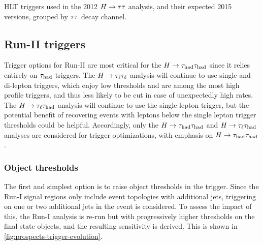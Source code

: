 \begin{table}[bp] 
  \centering
  \renewcommand{\arraystretch}{1.4}
  \caption{HLT triggers used in the 2012 $H\rightarrow\tau\tau$ analysis, and their expected 2015 versions, grouped by $\tau\tau$ decay channel.}
  
  \label{tab:prospects-triggersHLT}
\end{table}

\subsection{Run-II triggers}

Trigger options for Run-II are most critical for the $H\rightarrow\tau_\text{had}\tau_\text{had}$ since it relies entirely on $\tau_\text{had}$ triggers. The $H\rightarrow\tau_\ell\tau_\ell$ analysis will continue to use single and di-lepton triggers, which enjoy low thresholds and are among the most high profile triggers, and thus less likely to be cut in case of unexpectedly high rates. The $H\rightarrow\tau_\ell\tau_\text{had}$ analysis will continue to use the single lepton trigger, but the potential benefit of recovering events with leptons below the single lepton trigger thresholds could be helpful. Accordingly, only the $H\rightarrow\tau_\text{had}\tau_\text{had}$ and $H\rightarrow\tau_\ell\tau_\text{had}$ analyses are considered for trigger optimizations, with emphasis on $H\rightarrow\tau_\text{had}\tau_\text{had}$.

\subsubsection{Object thresholds}

The first and simplest option is to raise object thresholds in the trigger. Since the Run-I signal regions only include event topologies with additional jets, triggering on one or two additional jets in the event is considered. To assess the impact of this, the Run-I analysis is re-run but with progressively higher thresholds on the final state objects, and the resulting sensitivity is derived. This is shown in \cref{fig:prospects-trigger-evolution}.

